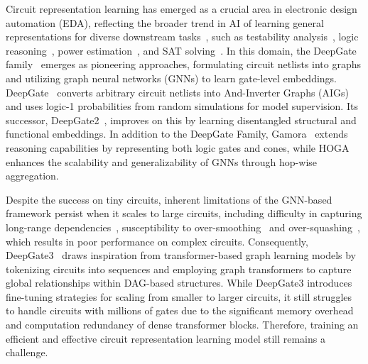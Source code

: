 

Circuit representation learning has emerged as a crucial area in electronic design automation (EDA), reflecting the broader trend in AI of learning general representations for diverse downstream tasks~\citep{chen2024large}, such as testability analysis~\citep{shi2022deeptpi}, logic reasoning~\citep{deng2024less, wu2023gamora}, power estimation~\citep{khan2023deepseq}, and SAT solving~\citep{li2023eda, shi2024eda}. In this domain, the DeepGate family~\citep{li2022deepgate, shi2023deepgate2} emerges as pioneering approaches, formulating circuit netlists into graphs and utilizing graph neural networks (GNNs) to learn gate-level embeddings. DeepGate~\citep{li2022deepgate} converts arbitrary circuit netlists into And-Inverter Graphs (AIGs) and uses logic-1 probabilities from random simulations for model supervision. Its successor, DeepGate2~\citep{shi2023deepgate2}, improves on this by learning disentangled structural and functional embeddings. In addition to the DeepGate Family, Gamora~\citep{wu2023gamora} extends reasoning capabilities by representing both logic gates and cones, while HOGA~\citep{deng2024less} enhances the scalability and generalizability of GNNs through hop-wise aggregation.

Despite the success on tiny circuits, inherent limitations of the GNN-based framework persist when it scales to large circuits, including difficulty in capturing long-range dependencies~\citep{alon2020bottleneck}, susceptibility to over-smoothing~\citep{akansha2023over} and over-squashing~\citep{rusch2023survey}, which results in poor performance on complex circuits. Consequently, DeepGate3~\citep{shi2024deepgate3} draws inspiration from transformer-based graph learning models by tokenizing circuits into sequences and employing graph transformers to capture global relationships within DAG-based structures. While DeepGate3 introduces fine-tuning strategies for scaling from smaller to larger circuits, it still struggles to handle circuits with millions of gates due to the significant memory overhead and computation redundancy of dense transformer blocks. Therefore, training an efficient and effective circuit representation learning model still remains a challenge.


